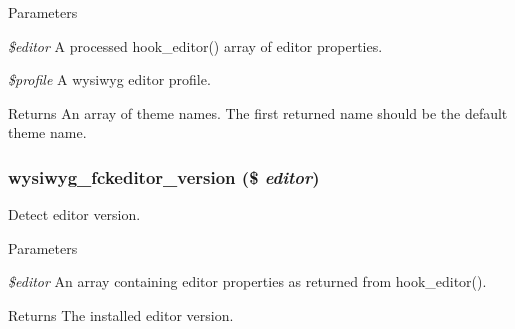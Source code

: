 \begin{DoxyParams}{Parameters}
\item[{\em \$editor}]A processed hook\_\-editor() array of editor properties. \item[{\em \$profile}]A wysiwyg editor profile.\end{DoxyParams}
\begin{DoxyReturn}{Returns}
An array of theme names. The first returned name should be the default theme name. 
\end{DoxyReturn}
\hypertarget{fckeditor_8inc_a0e38c82f156154b3dc7e2475a6ca0ba0}{
\subsubsection[{wysiwyg\_\-fckeditor\_\-version}]{\setlength{\rightskip}{0pt plus 5cm}wysiwyg\_\-fckeditor\_\-version (\$ {\em editor})}}
\label{fckeditor_8inc_a0e38c82f156154b3dc7e2475a6ca0ba0}
Detect editor version.


\begin{DoxyParams}{Parameters}
\item[{\em \$editor}]An array containing editor properties as returned from hook\_\-editor().\end{DoxyParams}
\begin{DoxyReturn}{Returns}
The installed editor version. 
\end{DoxyReturn}
